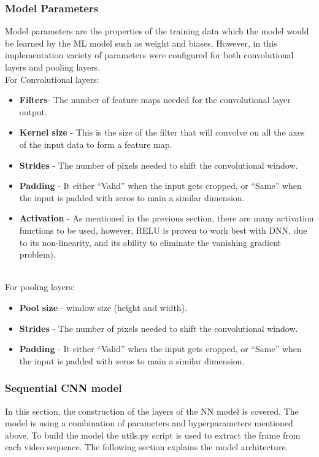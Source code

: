 \subsubsection{Model Parameters}
\hspace{5mm} Model parameters are the properties of the training data which the model would be learned by the ML model such as weight and biases. However, in this implementation variety of parameters were configured for both convolutional layers and pooling layers.\\

For Convolutional layers:
\begin{itemize}
\item \textbf{Filters}- The number of feature maps needed for the convolutional layer output.
\item \textbf{Kernel size} - This is the size of the filter that will convolve on all the axes of the input data to form a feature map.
\item \textbf{Strides} - The number of pixels needed to shift the convolutional window.
\item \textbf{Padding} - It either “Valid” when the input gets cropped, or “Same” when the input is padded with zeros to main a similar dimension.
\item \textbf{Activation }- As mentioned in the previous section, there are many activation functions to be used, however, RELU is proven to work best with DNN, due to its non-linearity, and its ability to eliminate the vanishing gradient problem).
\end{itemize}\\

For pooling layers:
\begin{itemize}
\item \textbf{Pool size} - window size (height and width).
\item \textbf{Strides} - The number of pixels needed to shift the convolutional window.
\item \textbf{Padding} - It either “Valid” when the input gets cropped, or “Same” when the input is padded with zeros to main a similar dimension.
\end{itemize}

\subsubsection{Sequential CNN model}
\hspace{5mm} In this section, the construction of the layers of the NN model is covered. The model is using a combination of parameters and hyperparameters mentioned above. To build the model the utils.py script is used to extract the frame from each video sequence. The following section explains the model architecture.\\

